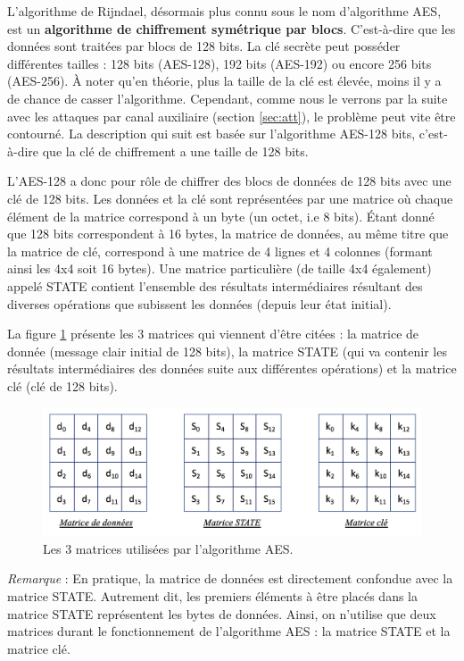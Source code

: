 \documentclass[10pt, oneside, a4paper]{article}
\begin{document}
L'algorithme de Rijndael, désormais plus connu sous le nom d'algorithme AES, est un \textbf{algorithme de chiffrement symétrique par blocs}. C'est-à-dire que les données sont traitées par blocs de 128 bits. La clé secrète peut posséder différentes tailles : 128 bits (AES-128), 192 bits (AES-192) ou encore 256 bits (AES-256). À noter qu'en théorie, plus la taille de la clé est élevée, moins il y a de chance de casser l'algorithme. Cependant, comme nous le verrons par la suite avec les attaques par canal auxiliaire (section \ref{sec:att}), le problème peut vite être contourné. La description qui suit est basée sur l'algorithme AES-128 bits, c'est-à-dire que la clé de chiffrement a une taille de 128 bits.

L'AES-128 a donc pour rôle de chiffrer des blocs de données de 128 bits avec une clé de 128 bits. Les données et la clé sont représentées par une matrice où chaque élément de la matrice correspond à un byte (un octet, i.e 8 bits). Étant donné que 128 bits correspondent à 16 bytes, la matrice de données, au même titre que la matrice de clé, correspond à une matrice de 4 lignes et 4 colonnes (formant ainsi les 4x4 soit 16 bytes). Une matrice particulière (de taille 4x4 également) appelé STATE contient l'ensemble des résultats intermédiaires résultant des diverses opérations que subissent les données (depuis leur état initial). 

La figure \ref{fig:matrix} présente les 3 matrices qui viennent d'être citées : la matrice de donnée (message clair initial de 128 bits), la matrice STATE (qui va contenir les résultats intermédiaires des données suite aux différentes opérations) et la matrice clé (clé de 128 bits).
\begin{figure}[htbp]
    \centering
    \includegraphics[scale=0.75]{image/matrix}
    \caption{Les 3 matrices utilisées par l'algorithme AES.}
    \label{fig:matrix}
\end{figure}

\textit{Remarque} : En pratique, la matrice de données est directement confondue avec la matrice STATE. Autrement dit, les premiers éléments à être placés dans la matrice STATE représentent les bytes de données. Ainsi, on n'utilise que deux matrices durant le fonctionnement de l'algorithme AES : la matrice STATE et la matrice clé.
\end{document}
